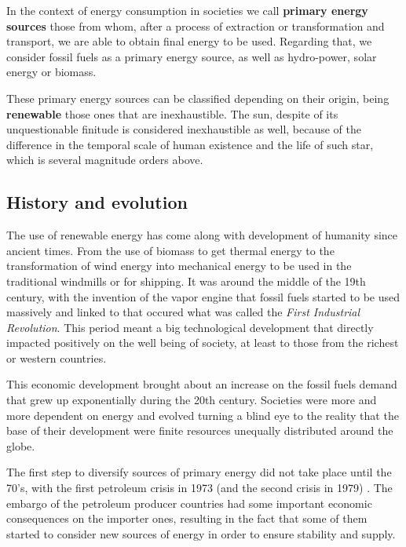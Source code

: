 
In the context of energy consumption in societies we call \textbf{primary energy sources} those from whom, after a process of extraction or transformation and transport, we are able to obtain final energy to be used. Regarding that, we consider fossil fuels as a primary energy source, as well as hydro-power, solar energy or biomass. %

These primary energy sources can be classified depending on their origin, being \textbf{renewable} those ones that are inexhaustible. The sun, despite of its unquestionable finitude is considered inexhaustible as well, because of the difference in the temporal scale of  human existence and the life of such star, which is several magnitude orders above.

\subsection{History and evolution}

The use of renewable energy has come along with development of humanity since ancient times. From the use of biomass to get thermal energy to the transformation of wind energy into mechanical energy to be used in the traditional windmills or for shipping. It was around the middle of the 19th century, with the invention of the vapor engine that fossil fuels started to be used massively and linked to that occured what was called the \textit{First Industrial Revolution}. This period meant a big technological development that directly impacted positively on the well being of society, at least to those from the richest or western countries.
 
This economic development brought about an increase on the fossil fuels demand that grew up exponentially during the 20th century. Societies were more and more dependent on energy and evolved turning a blind eye to the reality that the base of their development were finite resources unequally distributed around the globe.

The first step to diversify sources of primary energy did not take place until the 70's, with the first petroleum crisis in 1973 (and the second crisis in 1979) \cite*{Sorensen1991}. The embargo of the petroleum producer countries had some important economic consequences on the importer ones, resulting in the fact that some of them started to consider new sources of energy in order to ensure stability and supply.


